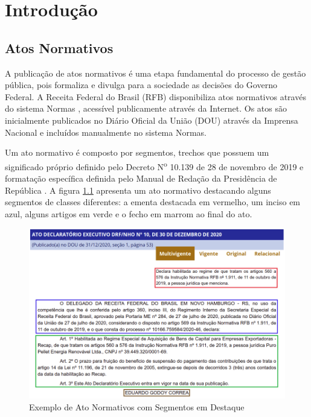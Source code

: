 \chapter{Introdução}

\section{Atos Normativos}

A publicação de atos normativos é uma etapa fundamental do processo de gestão pública, pois formaliza e divulga para a sociedade as decisões do Governo Federal. A Receita Federal do Brasil (RFB) disponibiliza atos normativos através do sistema Normas \cite{Normas2021}, acessível publicamente através da Internet. Os atos são inicialmente publicados no Diário Oficial da União (DOU) através da Imprensa Nacional \cite{ImprensaNacional2021} e incluídos manualmente no sistema Normas.

Um ato normativo é composto por segmentos, trechos que possuem um significado próprio definido pelo Decreto N\textsuperscript{o} 10.139 de 28 de novembro de 2019 \cite{Decreto10139} e formatação específica definida pelo Manual de Redação da Presidência de República \cite{ManualRedacao2018}. A figura \ref{fig:segmentos} apresenta um ato normativo destacando alguns segmentos de classes diferentes: a ementa destacada em vermelho, um inciso em azul, alguns artigos em verde e o fecho em marrom ao final do ato. 

\begin{figure}[h]
	\caption{Exemplo de Ato Normativos com Segmentos em Destaque}
	\center
	\label{fig:segmentos}
	\includegraphics[scale=1.9]{introducao/segmentos.png}
\end{figure}

